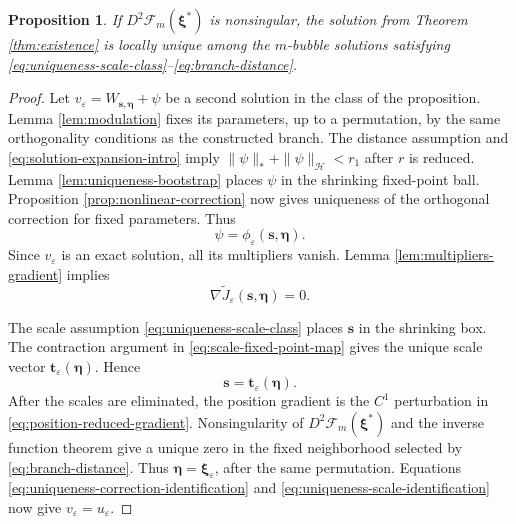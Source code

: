 \documentclass[11pt]{article}
\newtheorem{proposition}[theorem]{Proposition}
\numberwithin{equation}{section}
\begin{document}
\begin{proposition}\label{prop:local-uniqueness}
If $D^2\mathcal F_m(\boldsymbol\xi^*)$ is nonsingular, the solution
from Theorem \ref{thm:existence} is locally unique among the
$m$-bubble solutions satisfying
\eqref{eq:uniqueness-scale-class}--\eqref{eq:branch-distance}.
\end{proposition}

\begin{proof}
Let
$v_\varepsilon=W_{\boldsymbol s,\boldsymbol\eta}+\psi$ be a second
solution in the class of the proposition. Lemma
\ref{lem:modulation} fixes its parameters, up to a permutation, by
the same orthogonality conditions as the constructed branch.
The distance assumption and
\eqref{eq:solution-expansion-intro} imply
$\|\psi\|_*+\|\psi\|_{\mathcal H}<r_1$ after $r$ is reduced.
Lemma \ref{lem:uniqueness-bootstrap} places $\psi$ in the shrinking
fixed-point ball. Proposition \ref{prop:nonlinear-correction} now
gives uniqueness of the orthogonal correction for fixed parameters.
Thus
\begin{equation}\label{eq:uniqueness-correction-identification}
\psi=\phi_\varepsilon(\boldsymbol s,\boldsymbol\eta).
\end{equation}
Since $v_\varepsilon$ is an exact solution, all its multipliers
vanish. Lemma \ref{lem:multipliers-gradient} implies
\begin{equation*}
\nabla\widetilde J_\varepsilon
(\boldsymbol s,\boldsymbol\eta)=0.
\end{equation*}

The scale assumption \eqref{eq:uniqueness-scale-class} places
$\boldsymbol s$ in the shrinking box. The contraction argument in
\eqref{eq:scale-fixed-point-map} gives the unique scale vector
$\boldsymbol t_\varepsilon(\boldsymbol\eta)$. Hence
\begin{equation}\label{eq:uniqueness-scale-identification}
\boldsymbol s=\boldsymbol t_\varepsilon(\boldsymbol\eta).
\end{equation}
After the scales are eliminated, the position gradient is the
$C^1$ perturbation in \eqref{eq:position-reduced-gradient}.
Nonsingularity of $D^2\mathcal F_m(\boldsymbol\xi^*)$ and the inverse
function theorem give a unique zero in the fixed neighborhood
selected by \eqref{eq:branch-distance}. Thus
$\boldsymbol\eta=\boldsymbol\xi_\varepsilon$, after the same
permutation. Equations
\eqref{eq:uniqueness-correction-identification} and
\eqref{eq:uniqueness-scale-identification} now give
$v_\varepsilon=u_\varepsilon$.
\end{proof}
\end{document}
